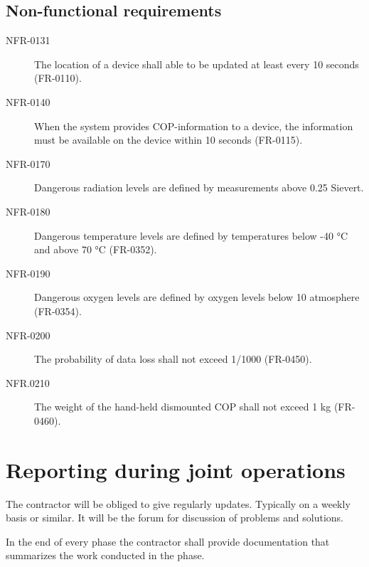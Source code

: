 \subsection{Non-functional requirements}
\begin{description}
\item[NFR-0131] The location of a device shall able to be updated at least every 10 seconds (FR-0110).
\item[NFR-0140] When the system provides COP-information to a device, the information must
be available on the device within 10 seconds (FR-0115).
\item[NFR-0170] Dangerous radiation levels are defined by measurements above 0.25 Sievert.
\item[NFR-0180] Dangerous temperature levels are defined by temperatures below -40 °C and
above 70 °C (FR-0352).
\item[NFR-0190] Dangerous oxygen levels are defined by oxygen levels below 10 %
atmosphere (FR-0354).
\item[NFR-0200] The probability of data loss shall not exceed 1/1000 (FR-0450).
\item[NFR.0210] The weight of the hand-held dismounted COP shall not exceed 1 kg (FR-0460).
\end{description}



\section{Reporting during joint operations}
The contractor will be obliged to give regularly updates. Typically on a weekly basis or similar. It will be the forum for discussion of problems and solutions. 

In the end of every phase the contractor shall provide documentation that summarizes the work conducted in the phase.